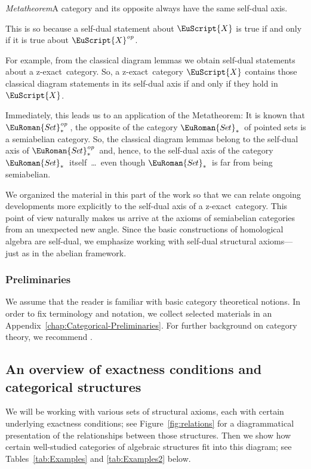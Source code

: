 \documentclass [12pt,oneside]{book}%
\theoremstyle{captionstyle}  %
\newcommand{\SetsBsd}{\EuRoman{S{\kern-0.12ex}e{\hskip-0.14ex}t}_{\ast}\,}	%
\newcommand{\SetsBsdOp}{\EuRoman{S{\kern-0.12ex}e{\hskip-0.14ex}t}_{\ast}^{\op}\,}	%
\newcommand{\op}{\ensuremath{\mathit{op}}}
\newcommand{\Ctgry}[1]{\EuScript{#1}}					%
\newcommand{\ZExact}{z-exact}									%
\begin{document}
\emph{Metatheorem}\quad A category and its opposite always have the same self-dual axis.

This is so because a self-dual statement about $\Ctgry{X}$ is true if and only if it is true about $\Ctgry{X}^{\op}$.

For example, from the classical diagram lemmas we obtain self-dual statements about a \ZExact\ category. So, a \ZExact\ category $\Ctgry{X}$ contains those classical diagram statements in its self-dual axis if and only if they hold in $\Ctgry{X}$.

Immediately, this leads us to an application of the Metatheorem: It is known that $\SetsBsdOp$, the opposite of the category $\SetsBsd$ of pointed sets is a semiabelian category. So, the classical diagram lemmas belong to the self-dual axis of $\SetsBsdOp$ and, hence, to the self-dual axis of the category $\SetsBsd$ itself\ \dots\ even though $\SetsBsd$ is far from being semiabelian.

We organized the material in this part of the work so that we can relate ongoing developments more explicitly to the self-dual axis of a \ZExact\ category. This point of view naturally makes us arrive at the axioms of semiabelian categories from an unexpected new angle. Since the basic constructions of homological algebra are self-dual, we emphasize working with self-dual structural axioms---just as in the abelian framework.


\subsubsection*{Preliminaries}

We assume that the reader is familiar with basic category theoretical notions. In order to fix terminology and notation, we collect selected materials in an Appendix~\ref{chap:Categorical-Preliminaries}. For further background on category theory, we recommend \cite{SMacLane1998,Borceux:Cats,AHS:Cats}.






\newpage
{}
\subsection*{An overview of exactness conditions and categorical structures}%
\label{sec:Examples-Overview}
\label{sec:SACatRecognize}%

We will be working with various sets of structural axioms, each with certain underlying exactness conditions; see Figure~\ref{fig:relations} for a diagrammatical presentation of the relationships between those structures. Then we show how certain well-studied categories of algebraic structures fit into this diagram; see Tables~\ref{tab:Examples} and \ref{tab:Examples2} below.
\end{document}
